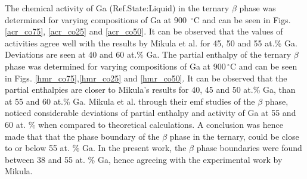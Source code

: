 \documentclass[article]{elsarticle}
\begin{document}
The chemical activity of Ga (Ref.State:Liquid) in the ternary $\beta$ phase was determined
for varying compositions of Ga at 900 $\,^{\circ}\mathrm{C}$ and can be seen in
Figs. \ref{acr_co75}, \ref{acr_co25} and \ref{acr_co50}. It can be observed that the values of
activities agree well with the results by Mikula et al.\cite{Mik87} for 45, 50 and 55 at.\% Ga.
Deviations are seen at 40 and 60 at.\% Ga. The partial enthalpy of the ternary $\beta$ phase was
determined for varying compositions of Ga  at 900$\,^{\circ}\mathrm{C}$ and can be
seen in Figs. \ref{hmr_co75},\ref{hmr_co25} and \ref{hmr_co50}. It can be observed that the partial
enthalpies are closer to Mikula's results \cite{Mik87} for 40, 45 and 50 at.\% Ga,
than at 55 and 60 at.\% Ga. Mikula et al. \cite{Mik87} through their emf studies
of the $\beta$ phase, noticed considerable deviations of partial enthalpy and activity
of Ga at 55 and 60 at. \% when compared to theoretical
calculations. A conclusion was hence made that that the phase boundary of the
$\beta$ phase in the ternary, could be close to or below 55 at. \% Ga.
In the present work, the $\beta$ phase boundaries were found between 38 and
55 at. \% Ga, hence agreeing with the experimental work by Mikula.
\end{document}

